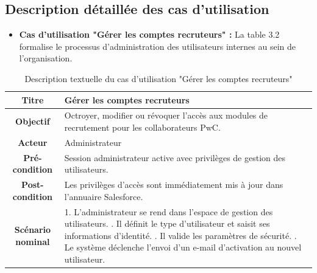 \subsection{Description détaillée des cas d'utilisation}
        \begin{itemize}
        \item \textbf{Cas d'utilisation "Gérer les comptes recruteurs" :} La table 3.2 formalise le processus d'administration des utilisateurs internes au sein de l'organisation.
    \end{itemize}
    \begin{table}[H]
    \caption{Description textuelle du cas d'utilisation "Gérer les comptes recruteurs"}
    \centering
    \begin{tabular}{|c|p{12cm}|}
    \hline
    \textbf{Titre} & Gérer les comptes recruteurs \\
    \hline
    \textbf{Objectif} & Octroyer, modifier ou révoquer l'accès aux modules de recrutement pour les collaborateurs PwC. \\
    \hline
    \textbf{Acteur}& Administrateur\\
    \hline
    \textbf{Pré-condition} & Session administrateur active avec privilèges de gestion des utilisateurs. \\
    \hline
    \textbf{Post-condition} & Les privilèges d'accès sont immédiatement mis à jour dans l'annuaire Salesforce. \\
    \hline
    \textbf{Scénario nominal} & 1. L'administrateur se rend dans l'espace de gestion des utilisateurs. \newline
    2. Il définit le type d'utilisateur et saisit ses informations d'identité. \newline
    3. Il valide les paramètres de sécurité. \newline
    4. Le système déclenche l'envoi d'un e-mail d'activation au nouvel utilisateur. \\
    \hline
    \end{tabular}
    \label{tab:uc_accounts}
\end{table}




